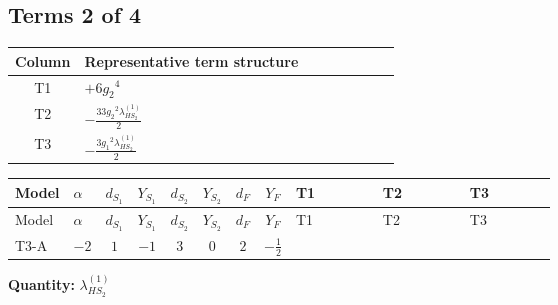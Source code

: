 \documentclass[8pt]{article}
\begin{document}
\begin{landscape}
\subsection*{Terms 2 of 4}
\begin{center}
\begin{tabular}{@{}c >{\raggedright\arraybackslash}p{0.82\linewidth}@{}}
\toprule
Column & Representative term structure \\
\midrule
T1 & \(\displaystyle +6 {g_2}^4\) \\
\midrule
T2 & \(\displaystyle -\frac{33 {g_2}^2 {\lambda_{HS_2}^{(1)}}}{2}\) \\
\midrule
T3 & \(\displaystyle -\frac{3 {g_1}^2 {\lambda_{HS_2}^{(1)}}}{2}\) \\
\midrule
\bottomrule
\end{tabular}
\end{center}
\smallskip
\tiny
\begin{longtable}{@{}llcccccc >{\raggedright\arraybackslash}p{0.21\linewidth} >{\raggedright\arraybackslash}p{0.21\linewidth} >{\raggedright\arraybackslash}p{0.21\linewidth}@{}}
\toprule
Model & $\alpha$ & $d_{S_1}$ & $Y_{S_1}$ & $d_{S_2}$ & $Y_{S_2}$ & $d_F$ & $Y_F$ & T1 & T2 & T3 \\
\midrule
\endfirsthead
\toprule
Model & $\alpha$ & $d_{S_1}$ & $Y_{S_1}$ & $d_{S_2}$ & $Y_{S_2}$ & $d_F$ & $Y_F$ & T1 & T2 & T3 \\
\midrule
\endhead
T3-A & $-2$ & $1$ & $-1$ & $3$ & $0$ & $2$ & $-\frac{1}{2}$ & \scriptsize\adjustbox{max width=\linewidth}{$\begin{gathered} +6 {g_2}^4\end{gathered}$} & \scriptsize\adjustbox{max width=\linewidth}{$\begin{gathered} -\frac{33 {g_2}^2 {\lambda_{HS_2}^{(1)}}}{2}\end{gathered}$} & \scriptsize\adjustbox{max width=\linewidth}{$\begin{gathered} -\frac{3 {g_1}^2 {\lambda_{HS_2}^{(1)}}}{2}\end{gathered}$} \\
\midrule
\bottomrule
\end{longtable}
\clearpage
\noindent\textbf{Quantity: }$\lambda_{HS_2}^{(1)}$\par\smallskip

\end{landscape}
\end{document}
